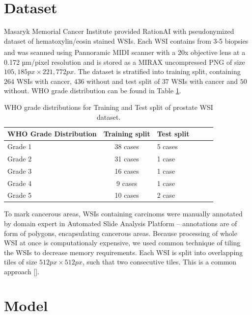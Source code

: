 \section{Dataset}

Masaryk Memorial Cancer Institute provided RationAI with pseudonymized dataset of hematoxylin/eosin stained WSIs. Each WSI contains from 3-5 biopsies and was scanned using Pannoramic\textsuperscript{\textregistered} MIDI scanner with a 20x objective lens at a 0.172 µm/pixel resolution and is stored as a MIRAX uncompressed PNG of size $105,185 px \times 221,772 px$. The dataset is stratified into training split, containing $264$ WSIs with cancer, $436$ without and test split of $37$ WSIs with cancer and $50$ without. WHO grade distribution can be found in Table \ref{tab:who_grade_distribution}.

\begin{table}[h!]
\centering
{}
\begin{tabular}{@{}l c l c l c @{}}\toprule
WHO Grade Distribution & Training split & Test split \\ 
\midrule
Grade 1         & 38 cases            & 5 cases      \\
Grade 2         & 31 cases            & 1 case       \\
Grade 3         & 16 cases            & 1 case       \\
Grade 4         & 9 cases             & 1 case       \\
Grade 5         & 10 cases            & 2 case       \\
\bottomrule
\end{tabular}
\caption{WHO grade distributions for Training and Test split of prostate WSI dataset.}
\label{tab:who_grade_distribution}
\end{table}

To mark cancerous areas, WSIs containing carcinoms were manually annotated by domain expert in Automated Slide Analysis Platform -- annotations are of form of polygons, encapsulating cancerous areas. Because processing of whole WSI at once is computationaly expensive, we used common technique of tiling the WSIs to decrease memory requirements. Each WSI is split into overlapping tiles of size $512px \times 512px$, such that two consecutive tiles. This is a common approach [].


\section{Model}

